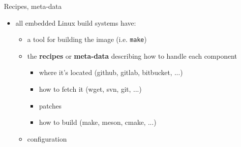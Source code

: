 \documentclass[aspectratio=169,obeyspaces,spaces,hyphens,dvipsnames]{beamer}
\begin{document}
\begin{frame}{Recipes, meta-data}
  \begin{itemize}
    \item all embedded Linux build systems have:
    \begin{itemize}
      \item a tool for building the image (i.e. \texttt{make})
      \item the {\bf recipes} or {\bf meta-data} describing how to handle each component
      \begin{itemize}
        \item where it's located (github, gitlab, bitbucket, ...)
        \item how to fetch it (wget, svn, git, ...)
        \item patches
        \item how to build (make, meson, cmake, ...)
      \end{itemize}
      \item configuration
    \end{itemize}
  \end{itemize}
\end{frame}
\end{document}
